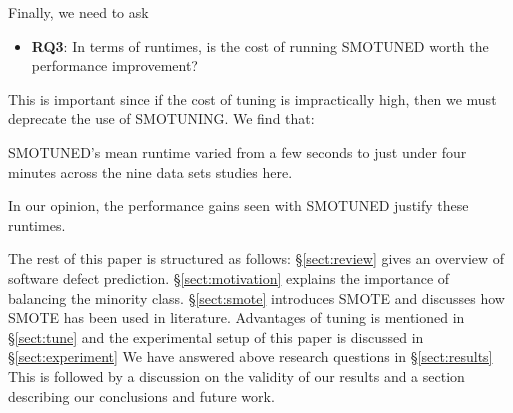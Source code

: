 \documentclass[10pt,conference]{IEEEtran}
\newcommand{\bi}{\begin{itemize}[leftmargin=0.4cm]}
\newcommand{\ei}{\end{itemize}}
\newcommand{\be}{\begin{enumerate}}
\newcommand{\ee}{\end{enumerate}}
\theoremstyle{break}
\theoremstyle{break}
\newcommand{\tion}[1]{{\S}\ref{sect:#1}}
\begin{document}
  Finally, we need to ask
   \bi
  \item
  \textbf{RQ3}:  In terms of runtimes, is the cost of running SMOTUNED worth the performance improvement?
  \ei
  This is important since if the cost
  of tuning is impractically high, then
  we must deprecate the use of SMOTUNING.  We find that:
   \begin{lesson}SMOTUNED's mean runtime
   varied from a few seconds to just under
   four minutes   across 
   the nine data sets studies here.
 \end{lesson}
In our opinion, the performance gains seen with SMOTUNED justify these runtimes.  




 



The rest of this paper is structured as follows:
\tion{review} gives an overview of software defect prediction. \tion{motivation} explains the importance of balancing the minority class.
\tion{smote} introduces SMOTE and discusses how SMOTE has been used in literature. Advantages
of tuning is mentioned in \tion{tune}
and the experimental setup of this paper is discussed in \tion{experiment}
We have answered above research questions in
\tion{results} This is followed by a discussion on the validity of our results 
and a section describing our conclusions and future work.
\end{document}
